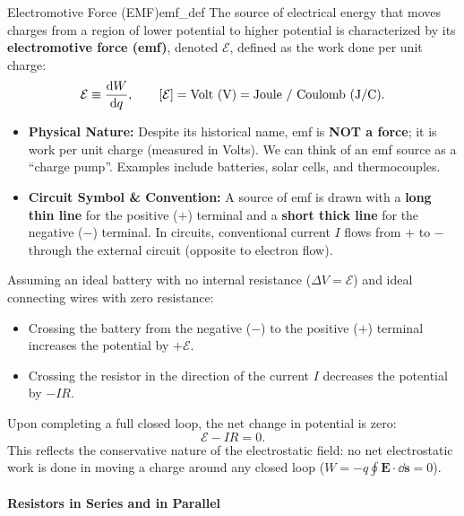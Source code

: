 \begin{definition}{Electromotive Force (EMF)}{emf_def}
The source of electrical energy that moves charges from a region of lower potential to higher potential is characterized by its \textbf{electromotive force (emf)}, denoted $\mathcal{E}$, defined as the work done per unit charge:
\begin{equation}
    \mathcal{E} \equiv \dv{W}{q}, \qquad [\mathcal{E}] = \text{Volt (V)} = \text{Joule / Coulomb (J/C)}.
\end{equation}
\begin{itemize}
    \item \textbf{Physical Nature:} Despite its historical name, emf is \textbf{NOT a force}; it is work per unit charge (measured in Volts). We can think of an emf source as a ``charge pump''. Examples include batteries, solar cells, and thermocouples.
    \item \textbf{Circuit Symbol \& Convention:} A source of emf is drawn with a \textbf{long thin line} for the positive ($+$) terminal and a \textbf{short thick line} for the negative ($-$) terminal. In circuits, conventional current $I$ flows from $+$ to $-$ through the external circuit (opposite to electron flow).
\end{itemize}
\end{definition}

Assuming an ideal battery with no internal resistance ($\Delta V = \mathcal{E}$) and ideal connecting wires with zero resistance:
\begin{itemize}
    \item Crossing the battery from the negative ($-$) to the positive ($+$) terminal increases the potential by $+\mathcal{E}$.
    \item Crossing the resistor in the direction of the current $I$ decreases the potential by $-IR$.
\end{itemize}
Upon completing a full closed loop, the net change in potential is zero:
\begin{equation}
    \mathcal{E} - I R = 0.
\end{equation}
This reflects the conservative nature of the electrostatic field: no net electrostatic work is done in moving a charge around any closed loop ($W = -q \oint \bm{E} \cdot \dd{\bm{s}} = 0$).

\paragraph{Resistors in Series and in Parallel}

